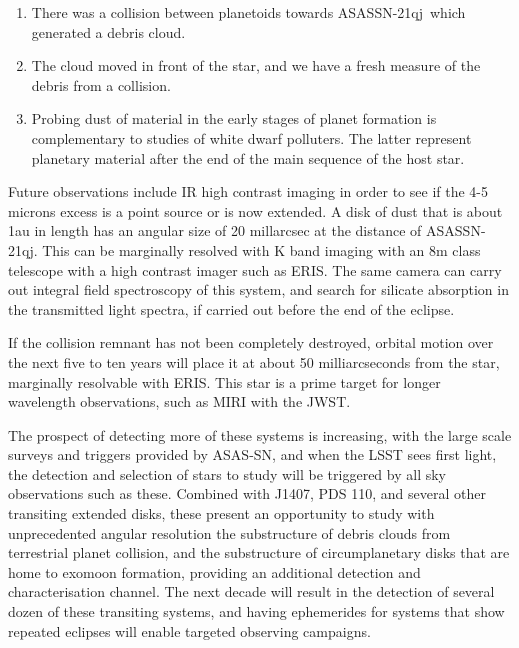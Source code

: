 \documentclass{aa}
\newcommand{\asas}{ASASSN-21qj}
\begin{document}
   \begin{enumerate}
      \item There was a collision between planetoids towards \asas\ which generated a debris cloud.
      \item The cloud moved in front of the star, and we have a fresh measure of the debris from a collision.
     \item Probing dust of material in the early stages of planet formation is complementary to studies of white dwarf polluters.
    The latter represent planetary material after the end of the main sequence of the host star.
   \end{enumerate}


Future observations include IR high contrast imaging in order to see if the 4-5 microns excess is a point source or is now extended.
%
A disk of dust that is about 1au in length has an angular size of 20 millarcsec at the distance of \asas .
%
This can be marginally resolved with K band imaging with an 8m class telescope with a high contrast imager such as ERIS.
%
The same camera can carry out integral field spectroscopy of this system, and search for silicate absorption in the transmitted light spectra, if carried out before the end of the eclipse.

If the collision remnant has not been completely destroyed, orbital motion over the next five to ten years will place it at about 50 milliarcseconds from the star, marginally resolvable with ERIS.
%
This star is a prime target for longer wavelength observations, such as MIRI with the JWST.

The prospect of detecting more of these systems is increasing, with the large scale surveys and triggers provided by ASAS-SN, and when the LSST sees first light, the detection and selection of stars to study will be triggered by all sky observations such as these.
%
Combined with J1407, PDS 110, and several other transiting extended disks, these present an opportunity to study with unprecedented angular resolution the substructure of debris clouds from terrestrial planet collision, and the substructure of circumplanetary disks that are home to exomoon formation, providing an additional detection and characterisation channel.
%
The next decade will result in the detection of several dozen of these transiting systems, and having ephemerides for systems that show repeated eclipses will enable targeted observing campaigns.
\end{document}
